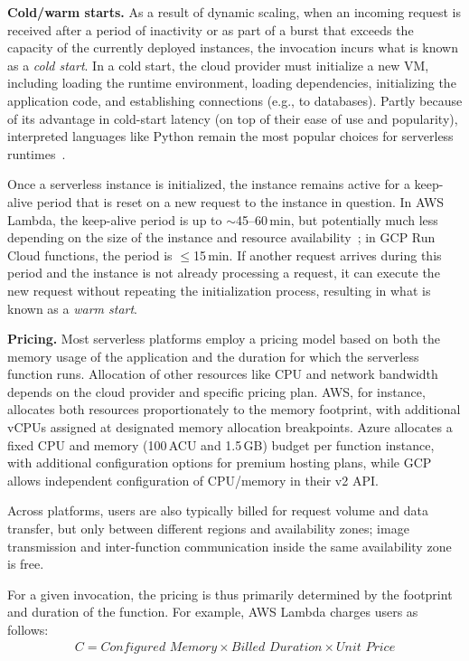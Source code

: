 \documentclass[sigplan,nonacm]{acmart}
\newcommand{\heading}[1]{\vspace{4pt}\noindent\textbf{#1.}}
\newcounter{example}
\begin{document}
\heading{Cold/warm starts}
As a result of dynamic scaling, when an incoming request is received after a period of inactivity or as part of a burst that exceeds the capacity of the currently deployed instances, the invocation incurs what is known as a \textit{cold start}.
In a cold start, the cloud provider must initialize a new VM, including loading the runtime environment, loading dependencies, initializing the application code, and establishing connections (e.g., to databases).
Partly because of its advantage in cold-start latency (on top of their ease of use and popularity), interpreted languages like Python remain the most popular choices for serverless runtimes~\cite{datadog}.


Once a serverless instance is initialized, the instance remains active for a keep-alive period that is reset on a new request to the instance in question.
In AWS Lambda, the keep-alive period is up to $\sim$45--60\,min, but potentially much less depending on the size of the instance and resource availability~\cite{keepalive-blog}; in GCP Run Cloud functions, the period is $\leq$15\,min. 
If another request arrives during this period and the instance is not already processing a request, it can execute the new request without repeating the initialization process, resulting in what is known as a \textit{warm start}.


\heading{Pricing}
Most serverless platforms employ a pricing model based on both the memory usage of the application and the duration for which the serverless function runs.
Allocation of other resources like CPU and network bandwidth depends on the cloud provider and specific pricing plan.
AWS, for instance, allocates both resources proportionately to the memory footprint, with additional vCPUs assigned at designated memory allocation breakpoints.
Azure allocates a fixed CPU and memory (100\,ACU and 1.5\,GB) budget per function instance, with additional configuration options for premium hosting plans, while GCP allows independent configuration of CPU/memory in their v2 API.

Across platforms, users are also typically billed for request volume and data transfer, but only between different regions and availability zones;
image transmission and inter-function communication inside the same availability zone is free.

For a given invocation, the pricing is thus primarily determined by the footprint and duration of the function.
For example, AWS Lambda charges users as follows:
\begin{align}\textit{C}=\textit{Configured Memory} \times \textit{Billed Duration} \times \textit{Unit Price} \label{eq:cost}
\end{align}
\end{document}
